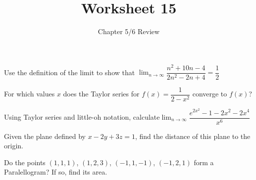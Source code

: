 \documentclass[paper=letter, 11pt]{article}
\title{Worksheet 15}
\subtitle{Chapter 5/6 Review}
\begin{document}
\maketitle

\Prob Use the definition of the limit to show that\quad
$\displaystyle\lim_{n \to \infty} \dfrac{n^2 + 10n - 4}{2n^2 - 2n + 4} = \dfrac{1}{2}$\vfill

\Prob For which values $x$ does the Taylor series for $f(x) = \dfrac{1}{2 - x^2}$ converge
to $f(x)$?\vfill

\newpage

\Prob Using Taylor series and little-oh notation, calculate\quad $\displaystyle \lim_{n \to \infty}\dfrac{e^{2x^2} - 1 - 2x^2 - 2x^4}{x^6}$\vfill

\Prob Given the plane defined by $x - 2y + 3z = 1$, find the distance of this plane
to the origin.\vfill

\Prob Do the points $(1, 1, 1)$, $(1,2,3)$, $(-1, 1, -1)$, $(-1, 2, 1)$ form a
Paralellogram?  If so, find its area.\vfill

\newpage 
\end{document}
